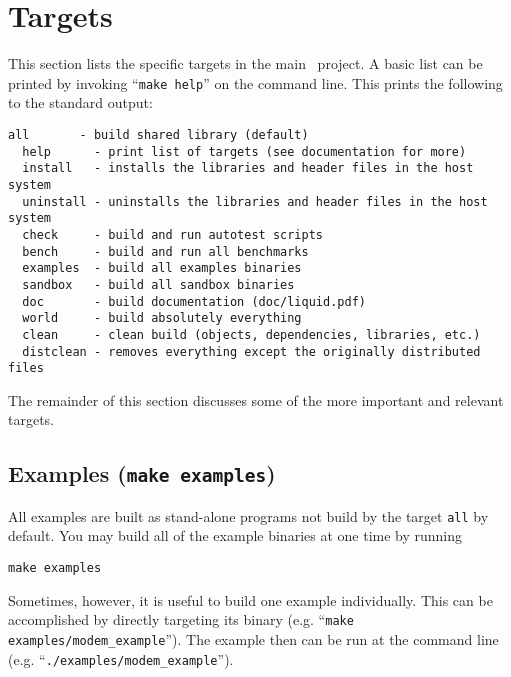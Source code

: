 
\section{Targets}
\label{section:installation:targets}
This section lists the specific targets in the main \liquid\ project.
A basic list can be printed by invoking ``{\tt make help}'' on the
command line.
This prints the following to the standard output:
%
\begin{Verbatim}[fontsize=\small]
  all       - build shared library (default)
  help      - print list of targets (see documentation for more)
  install   - installs the libraries and header files in the host system
  uninstall - uninstalls the libraries and header files in the host system
  check     - build and run autotest scripts
  bench     - build and run all benchmarks
  examples  - build all examples binaries
  sandbox   - build all sandbox binaries
  doc       - build documentation (doc/liquid.pdf)
  world     - build absolutely everything
  clean     - clean build (objects, dependencies, libraries, etc.)
  distclean - removes everything except the originally distributed files
\end{Verbatim}
%
The remainder of this section discusses some of the more important and
relevant targets.


\subsection{Examples ({\tt make examples})}
\label{section:installation:targets:examples}
All examples are built as stand-alone programs not build by the target
{\tt all} by default.
You may build all of the example binaries at one time by running
%
\begin{Verbatim}[fontsize=\small]
    make examples
\end{Verbatim}
%
Sometimes, however, it is useful to build one example individually.
This can be accomplished by directly targeting its binary
(e.g. ``{\tt make examples/modem\_example}'').
The example then can be run at the command line
(e.g. ``{\tt ./examples/modem\_example}'').

